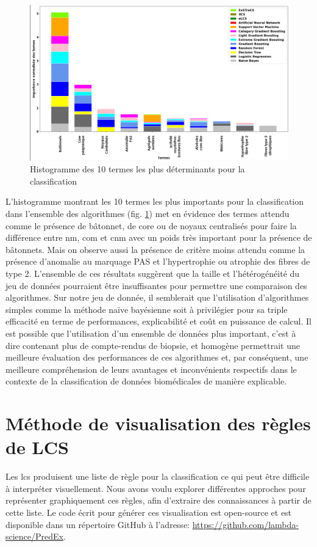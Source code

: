 \begin{figure}[htbp]
  \centering
  \includegraphics[width=1\textwidth]{figures/feature_importance.png}
  \caption[Histogramme des 10 termes les plus déterminants pour la classification]{Histogramme des 10 termes les plus déterminants pour la classification}
  \label{fig:feautre_importance}
\end{figure}
L'histogramme montrant les 10 termes les plus importants pour la classification dans l'ensemble des algorithmes (fig. \ref{fig:feautre_importance}) met en évidence des termes attendu comme le présence de bâtonnet, de core ou de noyaux centralisés pour faire la différence entre \gls{nm}, \gls{com} et \gls{cnm} avec un poids très important pour la présence de bâtonnets. Mais on observe aussi la présence de critère moins attendu comme la présence d'anomalie au marquage PAS et l'hypertrophie ou atrophie des fibres de type 2.
L'ensemble de ces résultats suggèrent que la taille et l'hétérogénéité du jeu de données pourraient être insuffisantes pour permettre une comparaison des algorithmes. Sur notre jeu de donnée, il semblerait que l'utilisation d'algorithmes simples comme la méthode naïve bayésienne soit à privilégier pour sa triple efficacité en terme de performances, explicabilité et coût en puissance de calcul.  Il est possible que l'utilisation d'un ensemble de données plus important, c'est à dire contenant plus de compte-rendus de biopsie, et homogène permettrait une meilleure évaluation des performances de ces algorithmes et, par conséquent, une meilleure compréhension de leurs avantages et inconvénients respectifs dans le contexte de la classification de données biomédicales de manière explicable.
\section{Méthode de visualisation des règles de LCS}
Les \gls{lcs} produisent une liste de règle pour la classification ce qui peut être difficile à interpréter visuellement. Nous avons voulu explorer différentes approches pour représenter graphiquement ces règles, afin d'extraire des connaissances à partir de cette liste. Le code écrit pour générer ces visualisation est open-source et est disponible dans un répertoire GitHub à l'adresse: \href{https://github.com/lambda-science/PredEx}{https://github.com/lambda-science/PredEx}.
